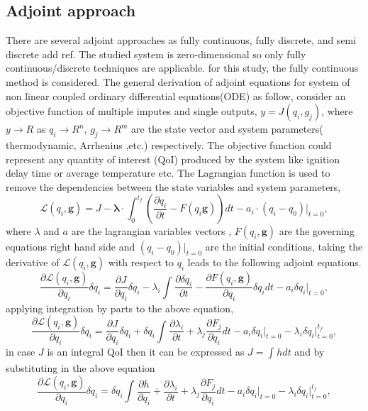 \documentclass[preprint,review,12pt]{elsarticle}
\begin{document}
\subsection{Adjoint approach}
There are several adjoint approaches as fully continuous, fully discrete, and semi discrete{\color{red} add ref}.  The studied system is zero-dimensional so only fully continuous/discrete techniques are applicable. for this study, the fully continuous method is considered. The general derivation of  adjoint equations for system of non linear coupled ordinary differential equations(ODE) as follow, 
consider an objective function of multiple imputes and single outputs, $y=J(q_i,g_j)$, where$y \rightarrow R$ as $q_i \rightarrow R^n$, $g_j \rightarrow R^m$ are the state vector and system parameters( thermodynamic, Arrhenius ,etc.) respectively. The objective function could represent any quantity of interest (QoI) produced by the system like ignition delay time or average temperature etc. The Lagrangian function is used to remove the dependencies between the state variables and system parameters, 
\begin{equation}
\mathcal{L}(q_i,\textbf{g})=J-\mathbf{\lambda} \cdot \int_{0}^{t_f} (\frac{\partial q_i}{\partial t}- F(q_i\textbf{g}))dt-a_i\cdot (q_i-q_0)\big|_{t=0},
\end{equation}    
where $\lambda$ and $a$ are the lagrangian variables vectors , $F(q_i,\textbf{g})$ are the governing equations right hand side and $(q_i-q_0)\big|_{t=0}$ are the initial conditions, taking the derivative of $\mathcal{L}(q_i,\textbf{g})$ with respect to $q_i$ leads to the following adjoint equations.
\begin{equation}
\frac{\partial \mathcal{L}(q_i,\textbf{g})}{\partial q_i} \delta q_i=\frac{\partial J}{\partial q_i} \delta q_i-\lambda_i\int_{}^{} \frac{\partial \delta{q_i}}{\partial t}-\frac{\partial F(q_i,\textbf{g})}{\partial q_i}\delta q_i dt-a_i \delta q_i\big|_{t=0}, 
\end{equation}
applying integration by parts to the above equation,
\begin{equation}
\frac{\partial \mathcal{L}(q_i,\textbf{g})}{\partial q_i} \delta q_i=\frac{\partial J}{\partial q_i} \delta q_i+\delta{q_i}\int_{}^{} \frac{\partial \lambda_i}{\partial t}+\lambda_j \frac{\partial F_j}{\partial q_i}dt-a_i \delta q_i\big|_{t=0}-\lambda_i \delta q_i\big|_{t=0}^{t_f}, 
\end{equation}
in case $J$ is an integral QoI  then it can be expressed as $J=\int_{}^{} h dt $ and by substituting in the above equation
\begin{equation}
\frac{\partial \mathcal{L}(q_i,\textbf{g})}{\partial q_i} \delta q_i=\delta{q_i}\int_{}^{} \frac{\partial h}{\partial q_i}+\frac{\partial \lambda_i}{\partial t}+\lambda_j\frac{\partial F_j}{\partial q_i}dt-a_i \delta q_i\big|_{t=0}-\lambda_i \delta q_i\big|_{t=0}^{t_f}, 
\end{equation}
\end{document}
